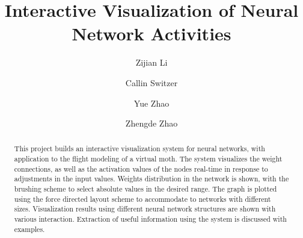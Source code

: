\documentclass[sigchi]{acmart}
\begin{document}
\title{Interactive Visualization of Neural Network Activities}

\author{Zijian Li}

\author{Callin Switzer}

\author{Yue Zhao}

\author{Zhengde Zhao}

\begin{abstract}
  This project builds an interactive visualization system for neural networks, with application to the flight modeling of a virtual moth. The system visualizes the weight connections, as well as the activation values of the nodes real-time in response to adjustments in the input values. Weights distribution in the network is shown, with the brushing scheme to select absolute values in the desired range. The graph is plotted using the force directed layout scheme to accommodate to networks with different sizes. Visualization results using different neural network structures are shown with various interaction. Extraction of useful information using the system is discussed with examples.
\end{abstract}


\end{document}
